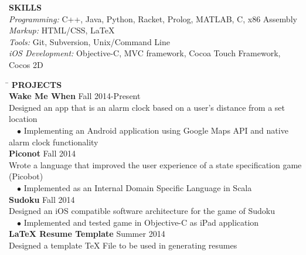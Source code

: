 \documentclass[11pt]{article}
\newcommand{\sectionNL}{\\[-2pt]}
\newcommand{\customtab}{$\hspace{10pt} \bullet \hspace{2pt}$}
\newcommand{\JudgeNudge}{\hspace{4pt}}
\begin{document}
\begin{flushleft}
{\textbf{SKILLS}} \sectionNL
\textit{Programming:} C++, Java, Python, Racket, Prolog, MATLAB, C, x86 Assembly\\
\textit{Markup:} HTML/CSS, LaTeX \\
\textit{Tools:} Git, Subversion, Unix/Command Line \\
\textit{iOS Development:} Objective-C, MVC framework, Cocoa Touch Framework, Cocos 2D %
\end{flushleft}

\begin{tabbing} 
\hspace*{6.5in}\= \kill
{\textbf{PROJECTS} } \> \sectionNL

\textbf{Wake Me When} \>Fall 2014-Present \\
\JudgeNudge Designed an app that is an alarm clock based on a user's distance from a set location \\
\customtab Implementing an Android application using Google Maps API and native alarm clock functionality \\

\textbf{Piconot} \>Fall 2014 \\
\JudgeNudge Wrote a language that improved the user experience of a state specification game (Picobot) \\
\customtab Implemented as an Internal Domain Specific Language in Scala \\
 
\textbf{Sudoku} \>Fall 2014 \\
\JudgeNudge Designed an iOS compatible software architecture for the game of Sudoku \\
\customtab Implemented and tested game in Objective-C as iPad application \\

\textbf{LaTeX Resume Template} \>Summer 2014 \\
\JudgeNudge Designed a template TeX File to be used in generating resumes
\end{tabbing} 
\end{document}
